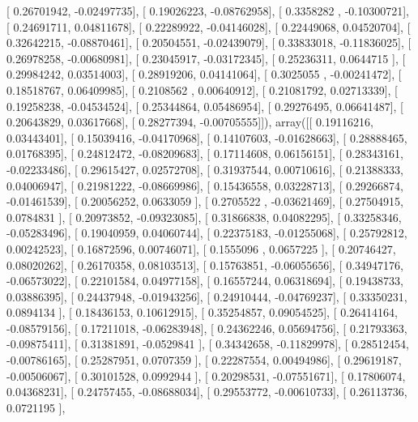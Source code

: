\documentclass{article}
\begin{document}
       [ 0.26701942, -0.02497735],
       [ 0.19026223, -0.08762958],
       [ 0.3358282 , -0.10300721],
       [ 0.24691711,  0.04811678],
       [ 0.22289922, -0.04146028],
       [ 0.22449068,  0.04520704],
       [ 0.32642215, -0.08870461],
       [ 0.20504551, -0.02439079],
       [ 0.33833018, -0.11836025],
       [ 0.26978258, -0.00680981],
       [ 0.23045917, -0.03172345],
       [ 0.25236311,  0.0644715 ],
       [ 0.29984242,  0.03514003],
       [ 0.28919206,  0.04141064],
       [ 0.3025055 , -0.00241472],
       [ 0.18518767,  0.06409985],
       [ 0.2108562 ,  0.00640912],
       [ 0.21081792,  0.02713339],
       [ 0.19258238, -0.04534524],
       [ 0.25344864,  0.05486954],
       [ 0.29276495,  0.06641487],
       [ 0.20643829,  0.03617668],
       [ 0.28277394, -0.00705555]]), array([[ 0.19116216,  0.03443401],
       [ 0.15039416, -0.04170968],
       [ 0.14107603, -0.01628663],
       [ 0.28888465,  0.01768395],
       [ 0.24812472, -0.08209683],
       [ 0.17114608,  0.06156151],
       [ 0.28343161, -0.02233486],
       [ 0.29615427,  0.02572708],
       [ 0.31937544,  0.00710616],
       [ 0.21388333,  0.04006947],
       [ 0.21981222, -0.08669986],
       [ 0.15436558,  0.03228713],
       [ 0.29266874, -0.01461539],
       [ 0.20056252,  0.0633059 ],
       [ 0.2705522 , -0.03621469],
       [ 0.27504915,  0.0784831 ],
       [ 0.20973852, -0.09323085],
       [ 0.31866838,  0.04082295],
       [ 0.33258346, -0.05283496],
       [ 0.19040959,  0.04060744],
       [ 0.22375183, -0.01255068],
       [ 0.25792812,  0.00242523],
       [ 0.16872596,  0.00746071],
       [ 0.1555096 ,  0.0657225 ],
       [ 0.20746427,  0.08020262],
       [ 0.26170358,  0.08103513],
       [ 0.15763851, -0.06055656],
       [ 0.34947176, -0.06573022],
       [ 0.22101584,  0.04977158],
       [ 0.16557244,  0.06318694],
       [ 0.19438733,  0.03886395],
       [ 0.24437948, -0.01943256],
       [ 0.24910444, -0.04769237],
       [ 0.33350231,  0.0894134 ],
       [ 0.18436153,  0.10612915],
       [ 0.35254857,  0.09054525],
       [ 0.26414164, -0.08579156],
       [ 0.17211018, -0.06283948],
       [ 0.24362246,  0.05694756],
       [ 0.21793363, -0.09875411],
       [ 0.31381891, -0.0529841 ],
       [ 0.34342658, -0.11829978],
       [ 0.28512454, -0.00786165],
       [ 0.25287951,  0.0707359 ],
       [ 0.22287554,  0.00494986],
       [ 0.29619187, -0.00506067],
       [ 0.30101528,  0.0992944 ],
       [ 0.20298531, -0.07551671],
       [ 0.17806074,  0.04368231],
       [ 0.24757455, -0.08688034],
       [ 0.29553772, -0.00610733],
       [ 0.26113736,  0.0721195 ],
\end{document}
